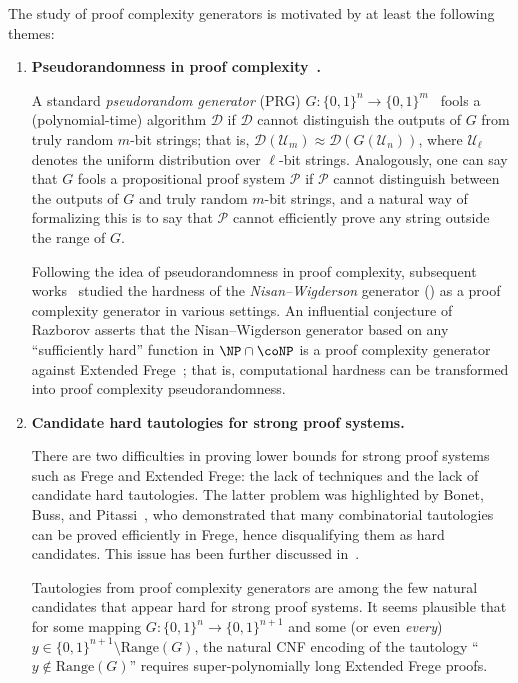 \documentclass[10pt,a4paper]{article}
\theoremstyle{definition}
\theoremstyle{remark}
\newcommand{\calD}{\mathcal{D}}
\newcommand{\calP}{\mathcal{P}}
\newcommand{\calU}{\mathcal{U}}
\newcommand{\Range}{\mathrm{Range}}
\begin{document}
The study of proof complexity generators is motivated by at least the following themes:
\begin{enumerate}
    \item {\bf Pseudorandomness in proof complexity~\cite{ABRW04}.}
    
    A standard \emph{pseudorandom generator} (PRG) $G: \{0, 1\}^n \to \{0, 1\}^m$~\cite{Yao82a} fools a (polynomial-time) algorithm $\calD$ if $\calD$ cannot distinguish the outputs of $G$ from truly random $m$-bit strings; that is, $\calD(\calU_m) \approx \calD(G(\calU_n))$, where $\calU_\ell$ denotes the uniform distribution over $\ell$-bit strings. Analogously, one can say that $G$ fools a propositional proof system $\calP$ if $\calP$ cannot distinguish between the outputs of $G$ and truly random $m$-bit strings, and a natural way of formalizing this is to say that $\calP$ cannot efficiently prove any string outside the range of $G$.

    Following the idea of pseudorandomness in proof complexity, subsequent works~\cite{Krajicek04, Pich11, Krajicek11, razborov2015pseudorandom, Khaniki22} studied the hardness of the \emph{Nisan--Wigderson} generator (\cite{NisanW94}) as a proof complexity generator in various settings. An influential conjecture of Razborov asserts that the Nisan--Wigderson generator based on any ``sufficiently hard'' function in $\NP\cap\coNP$ is a proof complexity generator against Extended Frege~\cite[Conjecture 2]{razborov2015pseudorandom}; that is, computational hardness can be transformed into proof complexity pseudorandomness.

    \item {\bf Candidate hard tautologies for strong proof systems.}
    
    There are two difficulties in proving lower bounds for strong proof systems such as Frege and Extended Frege: the lack of techniques and the lack of candidate hard tautologies. The latter problem was highlighted by Bonet, Buss, and Pitassi~\cite{BBP95}, who demonstrated that many combinatorial tautologies can be proved efficiently in Frege, hence disqualifying them as hard candidates. This issue has been further discussed in~\cite{krajivcek2001tautologies, Krajicek04, SanthanamT21, Khaniki22}.
    
    Tautologies from proof complexity generators are among the few natural candidates that appear hard for strong proof systems. It seems plausible that for some mapping $G: \{0, 1\}^n \to \{0, 1\}^{n+1}$ and some (or even \emph{every}) $y\in\{0, 1\}^{n+1}\setminus \Range(G)$, the natural CNF encoding of the tautology ``$y\not\in\Range(G)$'' requires super-polynomially long Extended Frege proofs.


\end{enumerate}
\end{document}
